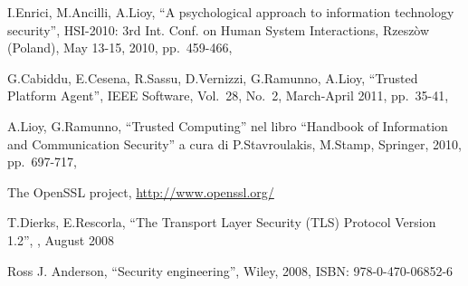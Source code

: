 

\begin{thebibliography}{9} %

I.Enrici, M.Ancilli, A.Lioy, %
``A psychological approach to information technology security'', %
HSI-2010: 3rd Int. Conf. on Human System Interactions, %
Rzeszòw (Poland), May 13-15, 2010, %
pp.\ 459-466, %

G.Cabiddu, E.Cesena, R.Sassu, D.Vernizzi, G.Ramunno, A.Lioy,  %
``Trusted Platform Agent'', %
IEEE Software, %
Vol.\ 28, No.\ 2, %
March-April 2011, %
pp.\ 35-41, %


A.Lioy, G.Ramunno, %
``Trusted Computing'' %
nel libro %
``Handbook of Information and Communication Security'' %
a cura di %
P.Stavroulakis, M.Stamp, %
Springer, %
2010, %
pp.\ 697-717, %

The OpenSSL project, %
\url{http://www.openssl.org/} %

T.Dierks, E.Rescorla,
``The Transport Layer Security (TLS) Protocol Version 1.2'',
, August 2008

Ross J. Anderson,
``Security engineering'',
Wiley, 2008,
ISBN: 978-0-470-06852-6


\end{thebibliography}
